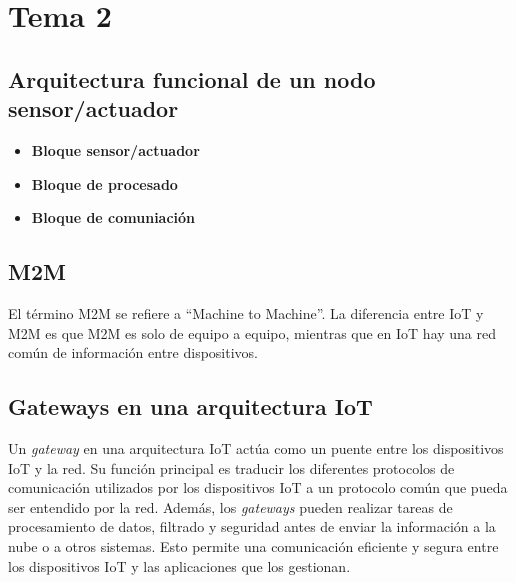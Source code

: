 \documentclass[12pt, letterpaper]{article}
\title{\doctitle}
\author{Juan Luis Serradilla Tormos}
\date{\monthname[\month] de \the\year}
\begin{document}
\pagestyle{fancy}

\maketitle

\newpage
\tableofcontents

\newpage

\section{Tema 2}

\subsection{Arquitectura funcional de un nodo sensor/actuador}

\begin{itemize}
    \item \textbf{Bloque sensor/actuador}
    \item \textbf{Bloque de procesado}
    \item \textbf{Bloque de comuniación}
\end{itemize}

\subsection{M2M}
El término M2M se refiere a ``Machine to Machine''. La diferencia entre IoT y M2M es que M2M es solo de equipo a equipo, mientras que en IoT hay una red común de información entre dispositivos.

\subsection{Gateways en una arquitectura IoT}
Un \textit{gateway} en una arquitectura IoT actúa como un puente entre los dispositivos IoT y la red. Su función principal es traducir los diferentes protocolos de comunicación utilizados por los dispositivos IoT a un protocolo común que pueda ser entendido por la red. Además, los \textit{gateways} pueden realizar tareas de procesamiento de datos, filtrado y seguridad antes de enviar la información a la nube o a otros sistemas. Esto permite una comunicación eficiente y segura entre los dispositivos IoT y las aplicaciones que los gestionan.
\end{document}
